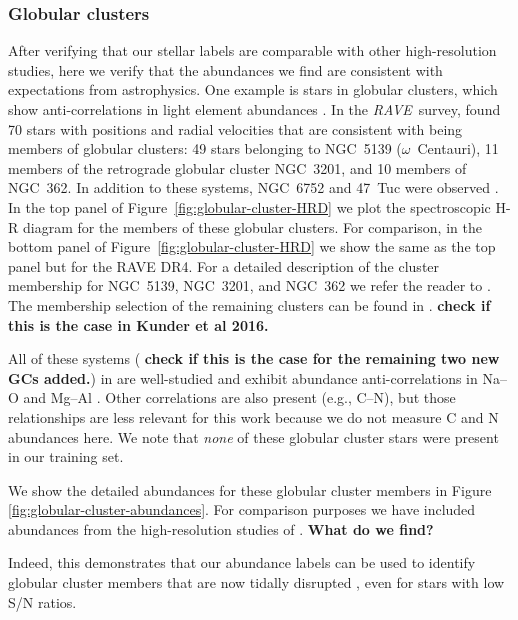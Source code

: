 \documentclass[preprint,trackchanges]{aastex}
\newcommand{\acronym}[1]{{\small{#1}}}
\newcommand{\project}[1]{\textsl{#1}}
\newcommand{\rave}{\project{\acronym{RAVE}}}
\newcommand{\stub}[1]{{\color{blue} \textbf{#1}}}
\begin{document}
\subsubsection{Globular clusters}
\label{sec:globular-cluster-validation}

After verifying that our stellar labels are comparable with other
high-resolution studies, here we verify that the abundances we find
are consistent with expectations from astrophysics.  One example is stars in
globular clusters, which show anti-correlations in light element abundances 
\citep[e.g.,][and references therein]{Norris_Da_Costa_1995,Carretta_2009}.  In the \rave\
survey, \cite{Anguiano_2015} found 70 stars with positions and radial velocities that are
consistent with being members of globular clusters: 49 stars belonging to NGC~5139 ($\omega$~Centauri), 11 members of the retrograde globular cluster NGC~3201, and 10 members of NGC~362. In addition to these systems, NGC~6752 and 47~Tuc were observed \citep{Kunder_2016}. In the top panel of Figure~\ref{fig:globular-cluster-HRD} we plot the spectroscopic H-R diagram for the members of these globular clusters. For comparison, in the bottom panel of Figure~\ref{fig:globular-cluster-HRD} we show the same as the top panel but for the RAVE DR4. For a detailed description of the cluster membership for NGC~5139, NGC~3201, and NGC~362 we refer the reader to \cite{Anguiano_2015}. The membership selection of the remaining clusters can be found in \cite{Kunder_2016}. \stub{check if this is the case in Kunder et al 2016.} 

All of these systems (\stub{check if this is the case for the remaining two new GCs added.}) in \cite{Anguiano_2015} are well-studied and exhibit abundance anti-correlations 
in Na--O and Mg--Al \citep{Marino_2011,Carretta_2009,Carretta_2013,Munoz_2013}.  Other correlations are also present 
(e.g., C--N), but those relationships are less relevant for this work because 
we do not measure C and N abundances here.  We note that \emph{none} of these 
globular cluster stars were present in our training set.




We show the detailed abundances for these globular cluster members in
Figure \ref{fig:globular-cluster-abundances}.  For comparison purposes we
have included abundances from the high-resolution studies of \citep{people}.
\stub{What do we find?}

Indeed, this demonstrates that our abundance labels can be used to identify
globular cluster members that are now tidally disrupted \citep{Anguiano_2016,Kuzma_2016,Navin_2016},
even for stars with low S/N ratios.
\end{document}
